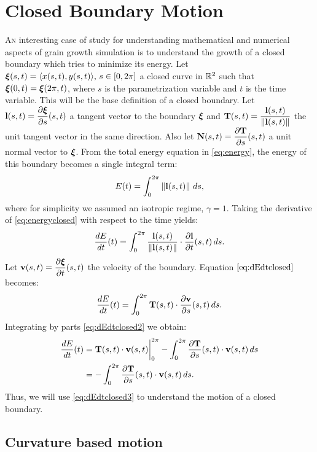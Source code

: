 \chapter{Closed Boundary Motion}
\label{chap:closedboundary}

\lettrine{A}{n} interesting case of study for understanding mathematical and numerical aspects of grain growth simulation is to understand the growth of a closed boundary which tries to minimize its energy. Let $\bm{\xi}(s,t) = \langle x(s,t), y(s,t)\rangle,\, s \in [0, 2\pi]$ a closed curve in $\mathbb{R}^2$ such that $\bm{\xi}(0,t) = \bm{\xi}(2\pi,t)$, where $s$ is the parametrization variable and $t$ is the time variable. This will be the base definition of a closed boundary. Let $\mathbf{l}(s,t) = \dfrac{\partial \bm{\xi}}{\partial s}(s,t)$ a tangent vector to the boundary $\bm{\xi}$ and $\mathbf{T}(s,t) = \dfrac{\mathbf{l}(s,t)}{\left\lVert\mathbf{l}(s,t)\right\rVert}$ the unit tangent vector in the same direction. Also let $\mathbf{N}(s,t) = \dfrac{\partial \mathbf{T}}{\partial s}(s,t)$ a unit normal vector to $\bm{\xi}$. From the total energy equation in \eqref{eq:energy}, the energy of this boundary becomes a single integral term:
\begin{equation}
    E(t) = \int_0^{2\pi} \left\lVert\mathbf{l}(s,t)\right\rVert\, ds,
    \label{eq:energyclosed}
\end{equation}
where for simplicity we assumed an isotropic regime, \ie $\gamma = 1$. Taking the derivative of \eqref{eq:energyclosed} with respect to the time yields:
\begin{equation}
    \dfrac{dE}{dt}(t) = \int_0^{2\pi} \dfrac{\mathbf{l}(s,t)}{\left\lVert\mathbf{l}(s,t)\right\rVert} \cdot \dfrac{\partial \mathbf{l}}{\partial t}(s,t) \, ds.
    \label{eq:dEdtclosed}
\end{equation}
Let $\mathbf{v}(s,t) = \dfrac{\partial \bm{\xi}}{\partial t}(s,t)$ the velocity of the boundary. Equation $\eqref{eq:dEdtclosed}$ becomes:
\begin{equation}
    \dfrac{dE}{dt}(t) = \int_0^{2\pi} \mathbf{T}(s,t) \cdot \dfrac{\partial \mathbf{v}}{\partial s}(s,t) \, ds.
    \label{eq:dEdtclosed2}
\end{equation}
Integrating by parts \eqref{eq:dEdtclosed2} we obtain:
\begin{align}
    \dfrac{dE}{dt}(t) &= \mathbf{T}(s,t)\cdot\mathbf{v}(s,t)\bigg\rvert_{0}^{2\pi} - \int_0^{2\pi}  \dfrac{\partial \mathbf{T}}{\partial s}(s,t) \cdot \mathbf{v}(s,t) \, ds \nonumber\\
    &= -\int_0^{2\pi} \dfrac{\partial \mathbf{T}}{\partial s}(s,t) \cdot \mathbf{v}(s,t)\, ds. \label{eq:dEdtclosed3}
\end{align}
Thus, we will use \eqref{eq:dEdtclosed3} to understand the motion of a closed boundary.

\section{Curvature based motion}

